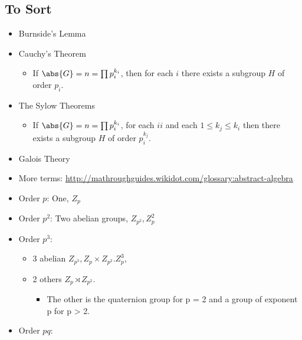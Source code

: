 
\hypertarget{to-sort}{%
\subsection{To Sort}\label{to-sort}}

\begin{itemize}
\item
  Burnside's Lemma
\item
  Cauchy's Theorem

  \begin{itemize}
  \tightlist
  \item
    If \(\abs{G} = n = \prod p_i^{k_i}\), then for each \(i\) there
    exists a subgroup \(H\) of order \(p_i\).
  \end{itemize}
\item
  The Sylow Theorems

  \begin{itemize}
  \tightlist
  \item
    If \(\abs{G} = n = \prod p_i^{k_i}\), for each \(ii\) and each
    \(1 \leq k_j \leq k_i\) then there exists a subgroup \(H\) of order
    \(p_i^{k_j}\).
  \end{itemize}
\item
  Galois Theory
\item
  More terms:
  \url{http://mathroughguides.wikidot.com/glossary:abstract-algebra}
\item
  Order \(p\): One, \(Z_p\)
\item
  Order \(p^2\): Two abelian groups, \(Z_{p^2}, Z_p^2\)
\item
  Order \(p^3\):

  \begin{itemize}
  \item
    3 abelian \(Z_{p^3}, Z_p \times Z_{p^2}. Z_p^3\),
  \item
    2 others \(Z_p \rtimes Z_{p^2}\).

    \begin{itemize}
    \tightlist
    \item
      The other is the quaternion group for p = 2 and a group of
      exponent p for p \textgreater{} 2.
    \end{itemize}
  \end{itemize}
\item
  Order \(pq\):


\end{itemize}
